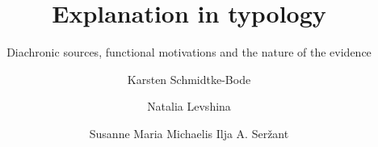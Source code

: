 \title{Explanation in typology}
\subtitle{Diachronic sources, functional motivations and the nature of the evidence}  
\BackBody{~}
\author{ 
Karsten Schmidtke-Bode 			
\and
Natalia Levshina 			
\and
Susanne Maria Michaelis 			
\lastand
Ilja A. Seržant }
\renewcommand{\lsSeries}{cfls} %
\renewcommand{\lsSeriesNumber}{3} %
\renewcommand{\lsID}{220} 


